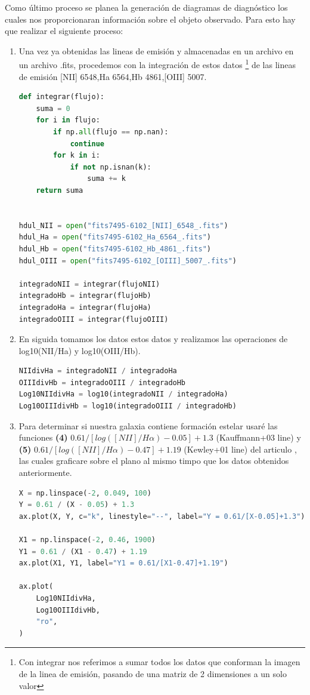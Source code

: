 \documentclass[9pt,twocolumn,a4paper]{opticajnl}
\begin{document}
Como último proceso se planea la generación de diagramas de diagnóstico los cuales nos proporcionaran información sobre el objeto observado. Para esto hay que realizar el siguiente proceso:
\begin{enumerate}
  \item Una vez ya obtenidas las lineas de emisión y almacenadas en un archivo en un archivo .fits, procedemos con la integración de estos datos \footnote{Con integrar nos referimos a sumar todos los datos que conforman la imagen de la linea de emisión, pasando de una matriz de 2 dimensiones a un solo valor} de las lineas de emisión [NII] 6548,Ha 6564,Hb 4861,[OIII] 5007.
    \begin{lstlisting}[language=Python]
def integrar(flujo):
    suma = 0
    for i in flujo:
        if np.all(flujo == np.nan):
            continue
        for k in i:
            if not np.isnan(k):
                suma += k
    return suma


hdul_NII = open("fits7495-6102_[NII]_6548_.fits")
hdul_Ha = open("fits7495-6102_Ha_6564_.fits")
hdul_Hb = open("fits7495-6102_Hb_4861_.fits")
hdul_OIII = open("fits7495-6102_[OIII]_5007_.fits")

integradoNII = integrar(flujoNII)
integradoHb = integrar(flujoHb)
integradoHa = integrar(flujoHa)
integradoOIII = integrar(flujoOIII)
    \end{lstlisting}
    
  \item En siguida tomamos los datos estos datos y realizamos las operaciones de log10(NII/Ha) y log10(OIII/Hb).
    \begin{lstlisting}[language=Python]
NIIdivHa = integradoNII / integradoHa
OIIIdivHb = integradoOIII / integradoHb
Log10NIIdivHa = log10(integradoNII / integradoHa)
Log10OIIIdivHb = log10(integradoOIII / integradoHb)
    \end{lstlisting}
  \item Para determinar si nuestra galaxia contiene formación estelar usaré las funciones \textbf{(4)} $0.61/[log([NII]/Hα) − 0.05] + 1.3$ (Kauffmann+03 line) y \textbf{(5)} $0.61/[log([N II]/Hα) − 0.47] + 1.19$  (Kewley+01 line) del articulo \cite{2006MNRAS.372..961K}, las cuales graficare sobre el plano al mismo timpo que los datos obtenidos anteriormente.
    \begin{lstlisting}[language=Python]
X = np.linspace(-2, 0.049, 100)
Y = 0.61 / (X - 0.05) + 1.3
ax.plot(X, Y, c="k", linestyle="--", label="Y = 0.61/[X-0.05]+1.3")

X1 = np.linspace(-2, 0.46, 1900)
Y1 = 0.61 / (X1 - 0.47) + 1.19
ax.plot(X1, Y1, label="Y1 = 0.61/[X1-0.47]+1.19")

ax.plot(
    Log10NIIdivHa,
    Log10OIIIdivHb,
    "ro",
)
    \end{lstlisting}

\end{enumerate}                                                                  
\end{document}
